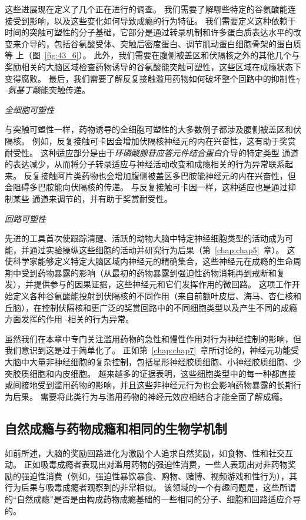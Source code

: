 这些进展现在定义了几个正在进行的调查。
我们需要了解哪些特定的谷氨酸能连接受到影响，以及这些变化如何导致成瘾的行为特征。
我们需要定义这种依赖于时间的突触可塑性的分子基础，它部分是通过转录机制和许多蛋白质表达水平的改变来介导的，包括谷氨酸受体、突触后密度蛋白、调节肌动蛋白细胞骨架的蛋白质等 上（图~\ref{fig:43_6}）。
此外，我们需要在腹侧被盖区和伏隔核之外的其他几个与奖励相关的大脑区域检查药物诱导的谷氨酸能突触可塑性，这些区域在成瘾状态下变得腐败。
最后，我们需要了解反复接触滥用药物如何破坏整个回路中的抑制性\textit{$\gamma$-氨基丁酸}能突触传递。


\textit{全细胞可塑性}

与突触可塑性一样，药物诱导的全细胞可塑性的大多数例子都涉及腹侧被盖区和伏隔核。
例如，反复接触可卡因会增加伏隔核神经元的内在兴奋性，这有助于奖赏耐受性。
这种适应部分是由于\textit{环磷酸腺苷应答元件结合蛋白}介导的特定类型  通道的表达减少，从而将分子转录适应与神经活动改变和成瘾相关的行为异常联系起来。
反复接触阿片类药物也会增加腹侧被盖区多巴胺能神经元的内在兴奋性，但会阻碍多巴胺能向伏隔核的传递。
与反复接触可卡因一样，这种适应也是通过抑制某些  通道来调节的，并有助于奖赏耐受性。


\textit{回路可塑性}

先进的工具首次使跟踪清醒、活跃的动物大脑中特定神经细胞类型的活动成为可能，并通过实验操纵这些细胞的活动并研究行为后果（第~\ref{chap:chap5}~章）。
这使科学家能够定义特定大脑区域内神经元的精确集合，这些神经元在成瘾的生命周期中受到药物暴露的影响（从最初的药物暴露到强迫性药物消耗再到戒断和复发），并提供参与的因果证据，这些神经元和它们发挥作用的微回路。
这项工作开始定义各种谷氨酸能投射到伏隔核的不同作用（来自前额叶皮层、海马、杏仁核和丘脑），在控制伏隔核和更广泛的奖赏回路中的不同细胞类型以及产生不同的成瘾方面发挥的作用 -相关的行为异常。


虽然我们在本章中专门关注滥用药物的急性和慢性作用对行为神经控制的影响，但我们意识到这是过于简单化了。
正如第~\ref{chap:chap7}~章所讨论的，神经元功能受大脑中大量非神经细胞的复杂控制，包括星形神经胶质细胞、小神经胶质细胞、少突胶质细胞和内皮细胞。
越来越多的证据表明，这些细胞类型中的每一种都直接或间接地受到滥用药物的影响，并且这些非神经元行为也会影响药物暴露的长期行为后果。
需要将此类行为与滥用药物的神经元效应相结合才能全面了解成瘾。



\subsection{自然成瘾与药物成瘾和相同的生物学机制}

如前所述，大脑的奖励回路进化为激励个人追求自然奖励，如食物、性和社交互动。
正如吸毒成瘾者表现出对滥用药物的强迫性消费，一些人表现出对非药物奖励的强迫性消费（例如，强迫性暴饮暴食、购物、赌博、视频游戏和性行为），其行为后果与吸毒成瘾者观察到的非常相似。
该领域的一个有趣问题是，这些所谓的“自然成瘾”是否是由构成药物成瘾基础的一些相同的分子、细胞和回路适应介导的。



